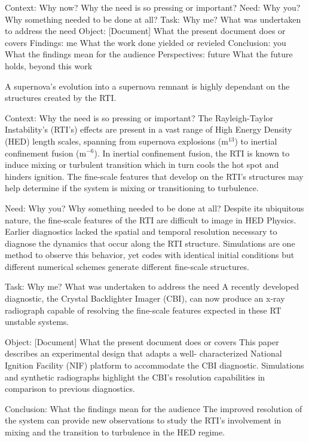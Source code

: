 Context: Why now?  Why the need is so pressing or important?
Need: Why you? Why something needed to be done at all?
Task: Why me? What was undertaken to address the need
Object: [Document] What the present document does or covers
Findings: me What the work done yielded or revieled
Conclusion: you What the findings mean for the audience
Perspectives: future What the future holds, beyond this work

 A supernova's evolution into a supernova remnant is highly dependant on the structures created by the RTI.

Context: Why the need is so pressing or important?
The Rayleigh-Taylor Instability's (RTI's) effects are present in a vast range of High Energy Density (HED) length scales, spanning from supernova explosions (m$^{13}$) to inertial confinement fusion (m$^{-6}$).  In inertial confinement fusion, the RTI is known to induce mixing or turbulent transition which in turn cools the hot spot and hinders ignition.  The fine-scale features that develop on the RTI's structures may help determine if the system is mixing or transitioning to turbulence. 


Need: Why you? Why something needed to be done at all?
Despite its ubiquitous nature, the fine-scale features of the RTI are difficult to image in HED Physics.  Earlier diagnostics lacked the spatial and temporal resolution necessary to diagnose the dynamics that occur along the RTI structure.  Simulations are one method to observe this behavior, yet codes with identical initial conditions but different numerical schemes generate different fine-scale structures.  


Task: Why me? What was undertaken to address the need
A recently developed diagnostic, the Crystal Backlighter Imager (CBI), can now produce an x-ray radiograph capable of resolving the fine-scale features expected in these RT unstable systems.

Object: [Document] What the present document does or covers
This paper describes an experimental design that adapts a well- characterized National Ignition Facility (NIF) platform to accommodate the CBI diagnostic. Simulations and synthetic radiographs highlight the CBI's resolution capabilities in comparison to previous diagnostics. 


Conclusion: What the findings mean for the audience
The improved resolution of the system can provide new observations to study the RTI's involvement in mixing and the transition to turbulence in the HED regime.  



